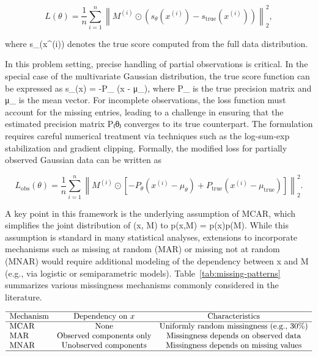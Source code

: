 \documentclass{article}
\begin{document}
\[
L(\theta) = \frac{1}{n} \sum_{i=1}^n \left\| M^{(i)} \odot \left(s_\theta(x^{(i)}) - s_{\mathrm{true}}(x^{(i)})\right) \right\|_2^2,
\]

where s_{}(x^{(i)}) denotes the true score computed from the full data distribution.

In this problem setting, precise handling of partial observations is critical. In the special case of the multivariate Gaussian distribution, the true score function can be expressed as s_{}(x) = -P_{} (x - μ_{}), where P_{} is the true precision matrix and μ_{} is the mean vector. For incomplete observations, the loss function must account for the missing entries, leading to a challenge in ensuring that the estimated precision matrix P₍θ₎ converges to its true counterpart. The formulation requires careful numerical treatment via techniques such as the log-sum-exp stabilization and gradient clipping. Formally, the modified loss for partially observed Gaussian data can be written as

\[
L_{\mathrm{obs}}(\theta) = \frac{1}{n} \sum_{i=1}^n \left\| M^{(i)} \odot \left[-P_\theta (x^{(i)} - \mu_\theta) + P_{\mathrm{true}} (x^{(i)} - \mu_{\mathrm{true}})\right] \right\|_2^2.
\]

A key point in this framework is the underlying assumption of MCAR, which simplifies the joint distribution of (x, M) to p(x,M) = p(x)p(M). While this assumption is standard in many statistical analyses, extensions to incorporate mechanisms such as missing at random (MAR) or missing not at random (MNAR) would require additional modeling of the dependency between x and M (e.g., via logistic or semiparametric models). Table~\ref{tab:missing-patterns} summarizes various missingness mechanisms commonly considered in the literature.

\[
\begin{array}{lcc}
\hline
\text{Mechanism} & \text{Dependency on } x & \text{Characteristics} \\
\hline
\text{MCAR} & \text{None} & \text{Uniformly random missingness (e.g., 30\%)} \\
\text{MAR}  & \text{Observed components only} & \text{Missingness depends on observed data} \\
\text{MNAR} & \text{Unobserved components} & \text{Missingness depends on missing values} \\
\hline
\end{array}
\]
\end{document}

